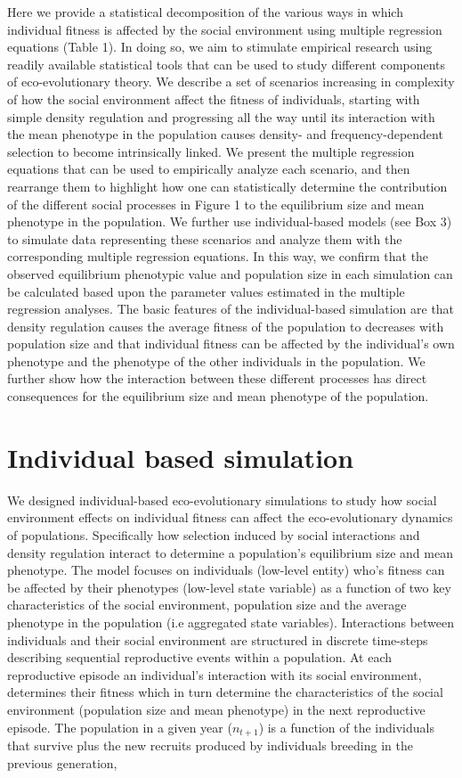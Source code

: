 \documentclass{article}
\begin{document}
Here we provide a statistical decomposition of the various ways in which individual fitness is affected by the social environment using multiple regression equations (Table 1). In doing so, we aim to stimulate empirical research using readily available statistical tools that can be used to study different components of eco-evolutionary theory. We describe a set of scenarios increasing in complexity of how the social environment affect the fitness of individuals, starting with simple density regulation and progressing all the way until its interaction with the mean phenotype in the population causes density- and frequency-dependent selection to become intrinsically linked. We present the multiple regression equations that can be used to empirically analyze each scenario, and then rearrange them to highlight how one can statistically determine the contribution of the different social processes in Figure 1 to the equilibrium size and mean phenotype in the population. We further use individual-based models (see Box 3) to simulate data representing these scenarios and analyze them with the corresponding multiple regression equations. In this way, we confirm that the observed equilibrium phenotypic value and population size in each simulation can be calculated based upon the parameter values estimated in the multiple regression analyses. The basic features of the individual-based simulation are that density regulation causes the average fitness of the population to decreases with population size and that individual fitness can be affected by the individual's own phenotype and the phenotype of the other individuals in the population. We further show how the interaction between these different processes has direct consequences for the equilibrium size and mean phenotype of the population. 


\section{Individual based simulation}
We designed individual-based eco-evolutionary simulations to study how social environment effects on individual fitness can affect the eco-evolutionary dynamics of populations. Specifically how selection induced by social interactions and density regulation interact to determine a population's equilibrium size and mean phenotype. The model focuses on individuals (low-level entity) who's fitness can be affected by their phenotypes (low-level state variable) as a function of two key characteristics of the social environment, population size and the average phenotype in the population (i.e aggregated state variables). Interactions between individuals and their social environment are structured in discrete time-steps describing sequential reproductive events within a population. At each reproductive episode an individual's interaction with its social environment, determines their fitness which in turn determine the characteristics of the social environment (population size and mean phenotype) in the next reproductive episode. The population in a given year ($n_{t+1}$) is a function of the individuals that survive plus the new recruits produced by individuals breeding in the previous generation, 
\end{document}
